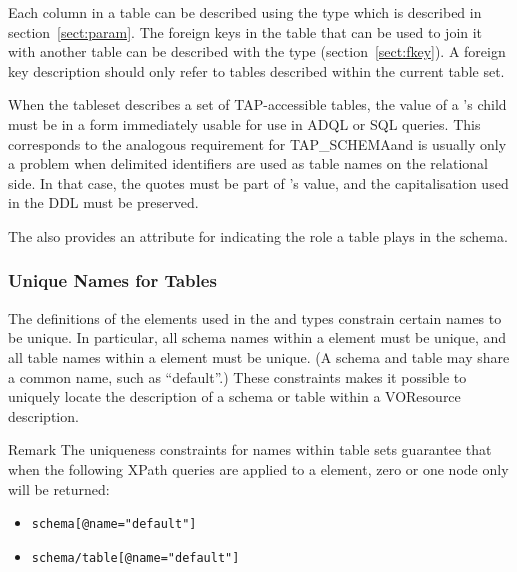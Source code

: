 \documentclass[11pt,a4paper]{ivoa}
\newcommand{\tapschema}{TAP\_SCHE\-MA}
\newcommand{\tapschema}{\mbox{%
  TAP\discretionary{-}{}{\kern-2pt\_}SCHEMA}}
\begin{document}




Each column in a table can be described using the
 type which is described in
section~\ref{sect:param}.  The foreign keys in the table that
can be used to join it with another table can be described with the
 type (section~\ref{sect:fkey}).
A foreign key description should only refer to tables described within
the current table set.  

When the tableset describes a set of TAP-accessible tables, the value of
a 's  child must be in a form immediately
usable for use in ADQL or SQL queries. This corresponds to the analogous
requirement for \tapschema and is usually only a problem when delimited
identifiers are used as table names on the relational side.  In that
case, the quotes must be part of 's value, and the
capitalisation used in the DDL must be preserved.


The  also provides an attribute for indicating
the role a table plays in the schema.





\subsubsection{Unique Names for Tables}
\label{sect:unique}


The definitions of the  elements used in
the  and
 types
constrain certain names to be unique.  In particular, all schema names
within a  element must be unique, and all
table names within a  element must be
unique.  (A schema and table may share a common name, such as
``default''.)  These constraints makes it possible to uniquely locate
the description of a schema or table within a VOResource description.  


\begin{admonition}{Remark}
The uniqueness constraints for names
within table sets guarantee that when the following XPath queries are
applied to a  element, zero or one node
only will be returned:

\begin{itemize}
\item\verb|schema[@name="default"]|
\item\verb|schema/table[@name="default"]|
\end{itemize}
\end{admonition}
\end{document}
